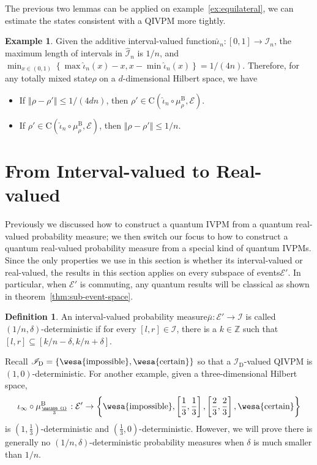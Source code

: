 \documentclass[12pt]{iopart}
\theoremstyle{plain}
\theoremstyle{definition}
\newtheorem{definition}[thm]{Definition}
\newtheorem{example}[thm]{Example}
\theoremstyle{remark}
\newcommand{\events}{\ensuremath{\mathcal{E}}}
\newcommand{\imposs}{{\mbox{\wesa{impossible}}}}
\newcommand{\necess}{{\mbox{\wesa{certain}}}}
\newcommand{\coreBorn}{\ensuremath{\mathrm{C}}}
\newcommand{\nb}{\nolinebreak[3] }
\begin{document}
The previous two lemmas can be applied on example~\ref{ex:equilateral},
we can estimate the states consistent with a QIVPM more tightly.

\begin{example}Given the additive interval-valued function\nb$\widehat{\iota}_{n}:\left[0,1\right]\rightarrow\widehat{\mathscr{I}}_{n}$,
the maximum length of intervals in $\widehat{\mathscr{I}}_{n}$ is
$1/n$, and $\min_{x\in\left(0,1\right)}\left\{ \max\widehat{\iota}_{n}\left(x\right)-x,x-\min\widehat{\iota}_{n}\left(x\right)\right\} =1/\left(4n\right)$.
Therefore, for any totally mixed state\nb$\rho$ on a $d$-dimensional
Hilbert space, we have
\begin{itemize}
\item If $\left\Vert \rho-\rho'\right\Vert \le1/\left(4dn\right)$, then
$\rho'\in\coreBorn\left(\widehat{\iota}_{n}\circ\mu_{\rho}^{\mathrm{B}},\events\right)$.
\item If $\rho'\in\coreBorn\left(\widehat{\iota}_{n}\circ\mu_{\rho}^{\mathrm{B}},\events\right)$,
then $\left\Vert \rho-\rho'\right\Vert \le1/n$.
\end{itemize}
\end{example}

\section{From Interval-valued to Real-valued}

Previously we discussed how to construct a quantum IVPM from a quantum
real-valued probability measure; we then switch our focus to how to
construct a quantum real-valued probability measure from a special
kind of quantum IVPMs. Since the only properties we use in this section
is whether its interval-valued or real-valued, the results in this
section applies on every subspace of events\nb$\events'$. In particular,
when $\events'$ is commuting, any quantum results will be classical
as shown in theorem~\ref{thm:sub-event-space}.

\begin{definition}\label{def:delta-deterministic}An interval-valued
probability measure\nb$\bar{\mu}:\events'\rightarrow\mathscr{I}$
is called $\left(1/n,\delta\right)$-deterministic if for every $\left[l,r\right]\in\mathscr{I}$,
there is a $k\in\mathbb{Z}$ such that $\left[l,r\right]\subseteq\left[k/n-\delta,k/n+\delta\right]$.\end{definition}

Recall $\mathscr{I}_{\mathrm{D}}=\left\{ \imposs,\necess\right\} $
so that a $\mathscr{I}_{\mathrm{D}}$-valued QIVPM is $\left(1,0\right)$-deterministic.
For another example, given a three-dimensional Hilbert space, 
\begin{equation}
\iota_{\infty}\circ\mu_{\frac{\mathbb{1}}{3}}^{\mathrm{B}}:\events'\rightarrow\left\{ \imposs,\left[\frac{1}{3},\frac{1}{3}\right],\left[\frac{2}{3},\frac{2}{3}\right],\necess\right\} 
\end{equation}
is $\left(1,\frac{1}{3}\right)$-deterministic and $\left(\frac{1}{3},0\right)$-deterministic.
However, we will prove there is generally no $\left(1/n,\delta\right)$-deterministic
probability measures when $\delta$ is much smaller than $1/n$.
\end{document}
